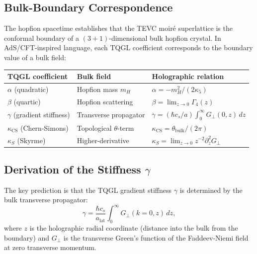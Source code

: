 \documentclass[11pt,letterpaper]{article}
\begin{document}
\subsection{Bulk-Boundary Correspondence}

The hopfion spacetime establishes that the TEVC moiré superlattice is the conformal boundary of a $(3+1)$-dimensional bulk hopfion crystal. In AdS/CFT-inspired language, each TQGL coefficient corresponds to the boundary value of a bulk field:

\begin{center}
\begin{tabular}{lll}
\toprule
\textbf{TQGL coefficient} & \textbf{Bulk field} & \textbf{Holographic relation} \\
\midrule
$\alpha$ (quadratic) & Hopfion mass $m_H$ & $\alpha = -m_H^2/(2\kappa_5)$ \\
$\beta$ (quartic) & Hopfion scattering & $\beta = \lim_{z\to 0} \Gamma_4(z)$ \\
$\gamma$ (gradient stiffness) & Transverse propagator & $\gamma = (\hbar c_s/a)\int_0^\infty G_\perp(0,z)\,dz$ \\
$\kappa_{\text{CS}}$ (Chern-Simons) & Topological $\theta$-term & $\kappa_{\text{CS}} = \theta_{\text{bulk}}/(2\pi)$ \\
$\kappa_S$ (Skyrme) & Higher-derivative & $\kappa_S = \lim_{z\to 0} z^{-2} \partial_z^2 G_\perp$ \\
\bottomrule
\end{tabular}
\end{center}

\subsection{Derivation of the Stiffness $\gamma$}

The key prediction is that the TQGL gradient stiffness $\gamma$ is determined by the bulk transverse propagator:
\begin{equation}
\gamma = \frac{\hbar c_s}{a_{\text{lat}}} \int_0^\infty G_\perp(k=0, z)\, dz,
\label{eq:gamma_holographic}
\end{equation}
where $z$ is the holographic radial coordinate (distance into the bulk from the boundary) and $G_\perp$ is the transverse Green's function of the Faddeev-Niemi field at zero transverse momentum.
\end{document}
